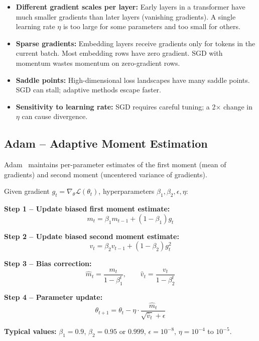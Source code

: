 \begin{warningbox}
\begin{itemize}
  \item \textbf{Different gradient scales per layer:} Early layers in a transformer have much smaller gradients than later layers (vanishing gradients). A single learning rate $\eta$ is too large for some parameters and too small for others.
  \item \textbf{Sparse gradients:} Embedding layers receive gradients only for tokens in the current batch. Most embedding rows have zero gradient. SGD with momentum wastes momentum on zero-gradient rows.
  \item \textbf{Saddle points:} High-dimensional loss landscapes have many saddle points. SGD can stall; adaptive methods escape faster.
  \item \textbf{Sensitivity to learning rate:} SGD requires careful tuning; a 2$\times$ change in $\eta$ can cause divergence.
\end{itemize}
\end{warningbox}

\subsection{Adam -- Adaptive Moment Estimation}
\label{adam-adaptive-moment-estimation}

Adam~\cite{kingma2015adam} maintains per-parameter estimates of the first moment (mean of gradients) and second moment (uncentered variance of gradients).

\begin{keybox}
Given gradient $g_t = \nabla_\theta \mathcal{L}(\theta_t)$, hyperparameters $\beta_1, \beta_2, \epsilon, \eta$:

\textbf{Step 1 -- Update biased first moment estimate:} 
\[
m_t = \beta_1 m_{t-1} + (1 - \beta_1) g_t
\]

\textbf{Step 2 -- Update biased second moment estimate:} 
\[
v_t = \beta_2 v_{t-1} + (1 - \beta_2) g_t^2
\]

\textbf{Step 3 -- Bias correction:} 
\[
\hat{m}_t = \frac{m_t}{1 - \beta_1^t}, \qquad \hat{v}_t = \frac{v_t}{1 - \beta_2^t}
\]

\textbf{Step 4 -- Parameter update:} 
\[
\theta_{t+1} = \theta_t - \eta \cdot \frac{\hat{m}_t}{\sqrt{\hat{v}_t} + \epsilon}
\]

\textbf{Typical values:} $\beta_1 = 0.9$, $\beta_2 = 0.95$ or $0.999$, $\epsilon = 10^{-8}$, $\eta = 10^{-4}$ to $10^{-5}$.
\end{keybox}

